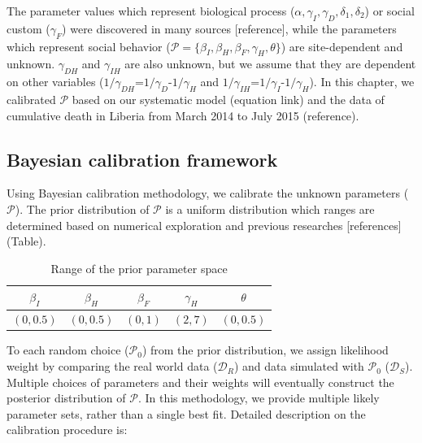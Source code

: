 

\label{sec:calibration}

The parameter values which represent biological process ($\alpha, \gamma_{I}, \gamma_{D}, \delta_{1}, \delta_{2}$) or social custom ($\gamma_{F}$) were discovered in many sources [reference], while the parameters which represent social behavior ($\mathcal{P}=\{\beta_{I}, \beta_{H}, \beta_{F}, \gamma_{H}, \theta\}$) are site-dependent and unknown. $\gamma_{DH}$ and $\gamma_{IH}$ are also unknown, but we assume that they are dependent on other variables ($1/\gamma_{DH}$=$1/\gamma_{D}$-$1/\gamma_{H}$ and $1/\gamma_{IH}$=$1/\gamma_{I}$-$1/\gamma_{H}$). In this chapter, we calibrated $\mathcal{P}$ based on our systematic model (equation link) and the data of cumulative death in Liberia from March 2014 to July 2015 (reference).
\subsection{Bayesian calibration framework}
Using Bayesian calibration methodology, we calibrate the unknown parameters ($\mathcal{P}$). The prior distribution of $\mathcal{P}$ is a uniform distribution which ranges are determined based on numerical exploration and previous researches [references] (Table). \\

\begin{table}[ht]
\caption{Range of the prior parameter space} %
\centering %
\begin{tabular}{c c c c c}
\hline\hline %
$\beta_{I}$ & $\beta_{H}$ & $\beta_{F}$ & $\gamma_{H}$ & $\theta$ \\ [0.5ex]
\hline %
$(0,0.5)$ & $(0,0.5)$ & $(0,1)$ & $(2,7)$ & $(0,0.5)$ \\ [0.5ex]
\hline
\end{tabular}
\label{tab:Prior Ranges}
\end{table}


To each random choice ($\mathcal{P}_0$) from the prior distribution, we assign likelihood weight by comparing the real world data ($\mathcal{D}_R$) and data simulated with $\mathcal{P}_0$ ($\mathcal{D}_S$). Multiple choices of parameters and their weights will eventually construct the posterior distribution of $\mathcal{P}$. In this methodology, we provide multiple likely parameter sets, rather than a single best fit. Detailed description on the calibration procedure is:\\

